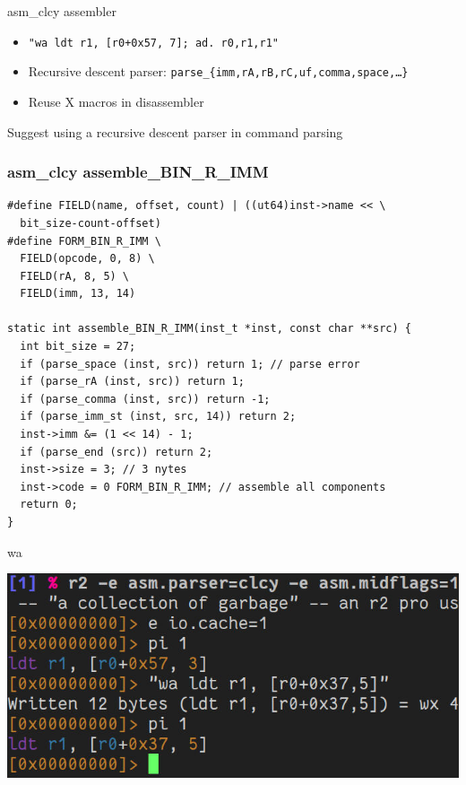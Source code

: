 \documentclass{beamer}
\begin{document}
\begin{frame}{asm\_clcy assembler}
  \begin{itemize}
  \item \texttt{"wa ldt r1, [r0+0x57, 7]; ad. r0,r1,r1"}
  \item Recursive descent parser: \texttt{parse\_\{imm,rA,rB,rC,uf,comma,space,\ldots\}}
  \item Reuse X macros in disassembler
  \end{itemize}

  \begin{center}
    Suggest using a recursive descent parser in command parsing
  \end{center}
\end{frame}

\begin{frame}[fragile]
  \frametitle{asm\_clcy assemble\_BIN\_R\_IMM}
  \scriptsize
  \begin{verbatim}
#define FIELD(name, offset, count) | ((ut64)inst->name << \
  bit_size-count-offset)
#define FORM_BIN_R_IMM \
  FIELD(opcode, 0, 8) \
  FIELD(rA, 8, 5) \
  FIELD(imm, 13, 14)

static int assemble_BIN_R_IMM(inst_t *inst, const char **src) {
  int bit_size = 27;
  if (parse_space (inst, src)) return 1; // parse error
  if (parse_rA (inst, src)) return 1;
  if (parse_comma (inst, src)) return -1;
  if (parse_imm_st (inst, src, 14)) return 2;
  inst->imm &= (1 << 14) - 1;
  if (parse_end (src)) return 2;
  inst->size = 3; // 3 nytes
  inst->code = 0 FORM_BIN_R_IMM; // assemble all components
  return 0;
}
  \end{verbatim}
\end{frame}

\begin{frame}{wa}
  \begin{center}
    \includegraphics[width=\linewidth]{wa.jpg}
  \end{center}
\end{frame}
\end{document}
